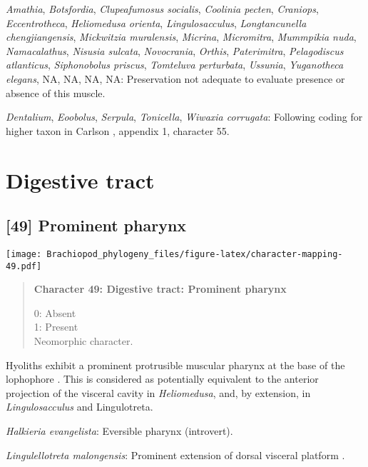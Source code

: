 \documentclass[openany]{book}
\theoremstyle{definition}
\theoremstyle{definition}
\theoremstyle{definition}
\theoremstyle{remark}
\begin{document}
\hypertarget{Amathia-coding-48}{}
\emph{Amathia}, \emph{Botsfordia}, \emph{Clupeafumosus socialis},
\emph{Coolinia pecten}, \emph{Craniops}, \emph{Eccentrotheca},
\emph{Heliomedusa orienta}, \emph{Lingulosacculus}, \emph{Longtancunella
chengjiangensis}, \emph{Mickwitzia muralensis}, \emph{Micrina},
\emph{Micromitra}, \emph{Mummpikia nuda}, \emph{Namacalathus},
\emph{Nisusia sulcata}, \emph{Novocrania}, \emph{Orthis},
\emph{Paterimitra}, \emph{Pelagodiscus atlanticus}, \emph{Siphonobolus
priscus}, \emph{Tomteluva perturbata}, \emph{Ussunia}, \emph{Yuganotheca
elegans}, NA, NA, NA, NA: Preservation not adequate to evaluate presence
or absence of this muscle.

\hypertarget{Dentalium-coding-48}{}
\emph{Dentalium}, \emph{Eoobolus}, \emph{Serpula}, \emph{Tonicella},
\emph{Wiwaxia corrugata}: Following coding for higher taxon in Carlson
\citeyearpar{Carlson1995Phylogeneticrelationships}, appendix 1,
character 55.

\section{Digestive tract}\label{digestive-tract}

\subsection*{{[}49{]} Prominent pharynx}\label{prominent-pharynx}

\texttt{[image: Brachiopod\_phylogeny\_files/figure-latex/character-mapping-49.pdf]}

\begin{quote}
\textbf{Character 49: Digestive tract: Prominent pharynx}

0: Absent\\
1: Present\\
Neomorphic character.
\end{quote}

Hyoliths exhibit a prominent protrusible muscular pharynx at the base of
the lophophore \citep{Moysiuk2017Hyolithsare}. This is considered as
potentially equivalent to the anterior projection of the visceral cavity
in \emph{Heliomedusa}, and, by extension, in \emph{Lingulosacculus} and
Lingulotreta.

\hypertarget{Halkieria_evangelista-coding-49}{}
\emph{Halkieria evangelista}: Eversible pharynx (introvert).

\hypertarget{Lingulellotreta_malongensis-coding-49}{}
\emph{Lingulellotreta malongensis}: Prominent extension of dorsal
visceral platform \citep{Balthasar2009Thebrachiopod}.
\end{document}
